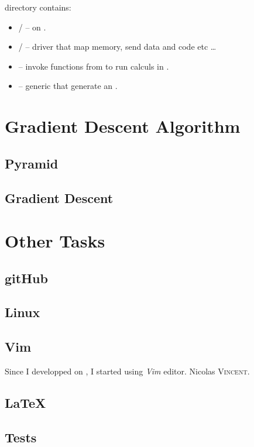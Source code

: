  directory contains:
\begin{itemize}
	\item {}/ --  on \vc.
	\item {}/ --  driver that map memory, send data and code etc \ldots
	\item {} -- invoke functions from  to run calculs in \vc.
	\item {} -- generic  that generate an .
\end{itemize}

\section{Gradient Descent Algorithm}

\subsection{Pyramid}

\subsection{Gradient Descent}





\section{Other Tasks}\label{FillingFile}

\subsection{gitHub}

\subsection{Linux}

\subsection{Vim}

Since I developped on \rasp{}, I started using \emph{Vim} editor. Nicolas \textsc{Vincent}.

\subsection{\LaTeX}

\subsection{Tests}


